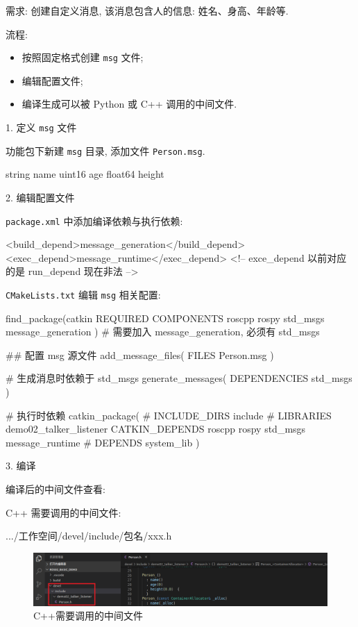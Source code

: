 \documentclass[openany, fontset=windowsold]{ctexbook}
\theoremstyle{kaiti}
\theoremstyle{normal}
\begin{document}
需求: 创建自定义消息, 该消息包含人的信息: 姓名、身高、年龄等.

流程:

\begin{itemize}
  \item 按照固定格式创建 \verb|msg| 文件;
  \item 编辑配置文件;
  \item 编译生成可以被 Python 或 C++ 调用的中间文件.
\end{itemize}

1. 定义 \verb|msg| 文件

功能包下新建 \verb|msg| 目录, 添加文件 \verb|Person.msg|.

\begin{cpp}
  string name
  uint16 age
  float64 height
\end{cpp}

2. 编辑配置文件

\verb|package.xml| 中添加编译依赖与执行依赖:

\begin{xml}
  <build_depend>message_generation</build_depend>
  <exec_depend>message_runtime</exec_depend>
  <!-- 
  exce_depend 以前对应的是 run_depend 现在非法
  -->
\end{xml}

\verb|CMakeLists.txt| 编辑 \verb|msg| 相关配置:

\begin{bash}
  find_package(catkin REQUIRED COMPONENTS
    roscpp
    rospy
    std_msgs
    message_generation
  )
  # 需要加入 message_generation, 必须有 std_msgs

  ## 配置 msg 源文件
  add_message_files(
    FILES
    Person.msg
  )

  # 生成消息时依赖于 std_msgs
  generate_messages(
    DEPENDENCIES
    std_msgs
  )

  # 执行时依赖
  catkin_package(
  #  INCLUDE_DIRS include
  #  LIBRARIES demo02_talker_listener
    CATKIN_DEPENDS roscpp rospy std_msgs message_runtime
  #  DEPENDS system_lib
  )
\end{bash}

3. 编译

编译后的中间文件查看:

C++ 需要调用的中间文件:

\begin{bash}
  .../工作空间/devel/include/包名/xxx.h
\end{bash}

\begin{figure}[!ht]
  \centering
  \includegraphics[width=.9\textwidth]{customized_msg_vscode_cpp.png}
  \caption{C++需要调用的中间文件}
  \label{fig:cusomized_msg_vscode_cpp}
\end{figure}
\end{document}
